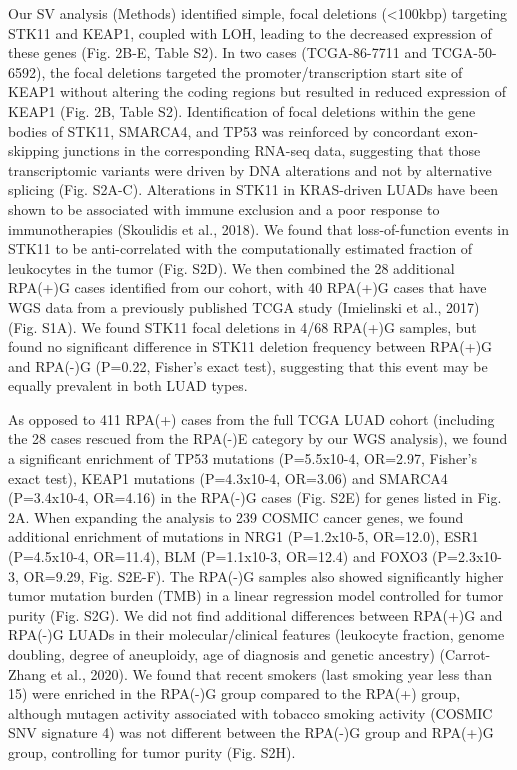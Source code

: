 \documentclass[phd,tocprelim]{cornell}
\begin{document}
Our SV analysis (Methods) identified simple, focal deletions (<100kbp) targeting STK11 and KEAP1, coupled with LOH, leading to the decreased expression of these genes (Fig. 2B-E, Table S2). In two cases (TCGA-86-7711 and TCGA-50-6592), the focal deletions targeted the promoter/transcription start site of KEAP1 without altering the coding regions but resulted in reduced expression of KEAP1 (Fig. 2B, Table S2). Identification of focal deletions within the gene bodies of STK11, SMARCA4, and TP53 was reinforced by concordant exon-skipping junctions in the corresponding RNA-seq data, suggesting that those transcriptomic variants were driven by DNA alterations and not by alternative splicing (Fig. S2A-C). Alterations in STK11 in KRAS-driven LUADs have been shown to be associated with immune exclusion and a poor response to immunotherapies (Skoulidis et al., 2018). We found that loss-of-function events in STK11 to be anti-correlated with the computationally estimated fraction of leukocytes in the tumor (Fig. S2D). We then combined the 28 additional RPA(+)G cases identified from our cohort, with 40 RPA(+)G cases that have WGS data from a previously published TCGA study (Imielinski et al., 2017) (Fig. S1A). We found STK11 focal deletions in 4/68 RPA(+)G samples, but found no significant difference in STK11 deletion frequency between RPA(+)G and RPA(-)G (P=0.22, Fisher’s exact test), suggesting that this event may be equally prevalent in both LUAD types.

As opposed to 411 RPA(+) cases from the full TCGA LUAD cohort (including the 28 cases rescued from the RPA(-)E category by our WGS analysis), we found a significant enrichment of TP53 mutations (P=5.5x10-4, OR=2.97, Fisher's exact test), KEAP1 mutations (P=4.3x10-4, OR=3.06) and SMARCA4 (P=3.4x10-4, OR=4.16) in the RPA(-)G cases (Fig. S2E) for genes listed in Fig. 2A. When expanding the analysis to 239 COSMIC cancer genes, we found additional enrichment of mutations in NRG1 (P=1.2x10-5, OR=12.0), ESR1 (P=4.5x10-4, OR=11.4), BLM (P=1.1x10-3, OR=12.4) and FOXO3 (P=2.3x10-3, OR=9.29, Fig. S2E-F). The RPA(-)G samples also showed significantly higher tumor mutation burden (TMB) in a linear regression model controlled for tumor purity (Fig. S2G). We did not find additional differences between RPA(+)G and RPA(-)G LUADs in their molecular/clinical features (leukocyte fraction, genome doubling, degree of aneuploidy, age of diagnosis and genetic ancestry) (Carrot-Zhang et al., 2020). We found that recent smokers (last smoking year less than 15) were enriched in the RPA(-)G group compared to the RPA(+) group, although mutagen activity associated with tobacco smoking activity (COSMIC SNV signature 4) was not different between the RPA(-)G group and RPA(+)G group, controlling for tumor purity (Fig. S2H).
\end{document}
